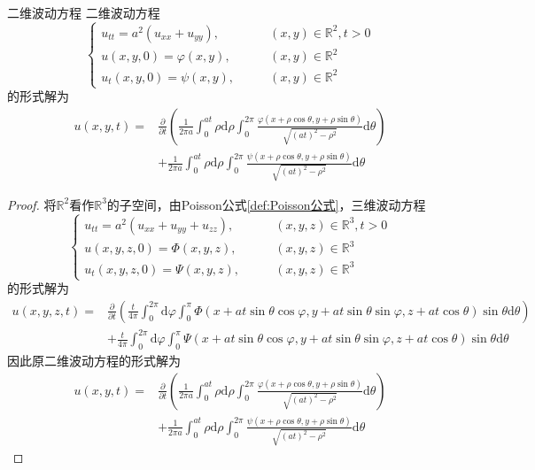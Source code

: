 \documentclass[lang = cn, scheme = chinese, thmcnt = section]{elegantbook}
\newcommand{\R}{\mathbb{R}}            %
\newcommand{\dd}{\mathrm{d}}           %
\begin{document}
\begin{theorem}{二维波动方程}
	二维波动方程
	$$
	\begin{cases}
		u_{tt}=a^2(u_{xx}+u_{yy}),\qquad & (x,y)\in \R^2,t>0\\
		u(x,y,0)=\varphi(x,y),\qquad & (x,y)\in \R^2\\
		u_t(x,y,0)=\psi(x,y),\qquad & (x,y)\in \R^2
	\end{cases}
	$$
	的形式解为
	\begin{align*}
		u(x,y,t)
		= & \frac{\partial}{\partial t}\left(\frac{1}{2\pi a}\int_{0}^{at}\rho\dd\rho\int_{0}^{2\pi}\frac{\varphi(x+\rho\cos\theta,y+\rho\sin\theta)}{\sqrt{(at)^2-\rho^2}}\dd\theta\right)\\
		& + \frac{1}{2\pi a}\int_{0}^{at}\rho\dd\rho\int_{0}^{2\pi}\frac{\psi(x+\rho\cos\theta,y+\rho\sin\theta)}{\sqrt{(at)^2-\rho^2}}\dd\theta
	\end{align*}
\end{theorem}

\begin{proof}
	将$\R^2$看作$\R^3$的子空间，由Poisson公式\ref{def:Poisson公式}，三维波动方程
	$$
	\begin{cases}
		u_{tt}=a^2(u_{xx}+u_{yy}+u_{zz}),\qquad & (x,y,z)\in \R^3,t>0\\
		u(x,y,z,0)=\Phi(x,y,z),\qquad & (x,y,z)\in \R^3\\
		u_t(x,y,z,0)=\Psi(x,y,z),\qquad & (x,y,z)\in \R^3
	\end{cases}
	$$
	的形式解为
	\begin{align*}
		u(x,y,z,t)
		= & \frac{\partial}{\partial t}\left(\frac{t}{4\pi}\int_{0}^{2\pi}\dd\varphi\int_{0}^{\pi}\Phi(x+at\sin\theta\cos\varphi,y+at\sin\theta\sin\varphi,z+at\cos\theta)\sin\theta\dd\theta\right)\\
		& + \frac{t}{4\pi}\int_{0}^{2\pi}\dd\varphi\int_{0}^{\pi}\Psi(x+at\sin\theta\cos\varphi,y+at\sin\theta\sin\varphi,z+at\cos\theta)\sin\theta\dd\theta
	\end{align*}
	因此原二维波动方程的形式解为
	\begin{align*}
		u(x,y,t)
		= & \frac{\partial}{\partial t}\left(\frac{1}{2\pi a}\int_{0}^{at}\rho\dd\rho\int_{0}^{2\pi}\frac{\varphi(x+\rho\cos\theta,y+\rho\sin\theta)}{\sqrt{(at)^2-\rho^2}}\dd\theta\right)\\
		& + \frac{1}{2\pi a}\int_{0}^{at}\rho\dd\rho\int_{0}^{2\pi}\frac{\psi(x+\rho\cos\theta,y+\rho\sin\theta)}{\sqrt{(at)^2-\rho^2}}\dd\theta
	\end{align*}
\end{proof}
\end{document}

